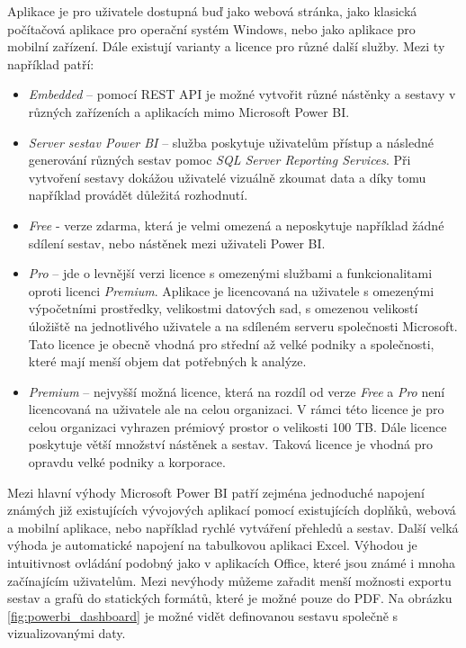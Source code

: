 \documentclass[czech,master]{diploma}
\begin{document}
Aplikace je pro uživatele dostupná buď jako webová stránka, jako klasická počítačová aplikace pro operační systém Windows, nebo jako aplikace pro mobilní zařízení. Dále existují varianty a licence pro různé další služby. Mezi ty například patří: \cite{ref:microsoft_bi_general}
\begin{itemize}
\item \textit{Embedded} -- pomocí REST API je možné vytvořit různé nástěnky a sestavy v různých zařízeních a aplikacích mimo Microsoft Power BI.
\item \textit{Server sestav Power BI} -- služba poskytuje uživatelům přístup a následné generování různých sestav pomoc \textit{SQL Server Reporting Services}. Při vytvoření sestavy dokážou uživatelé vizuálně zkoumat data a díky tomu například provádět důležitá rozhodnutí.
\item \textit{Free} - verze zdarma, která je velmi omezená a neposkytuje například žádné sdílení sestav, nebo nástěnek mezi uživateli Power BI.
\item \textit{Pro} -- jde o levnější verzi licence s omezenými službami a funkcionalitami oproti licenci \textit{Premium}. Aplikace je licencovaná na uživatele s omezenými výpočetními prostředky, velikostmi datových sad, s omezenou velikostí úložiště na jednotlivého uživatele a na sdíleném serveru společnosti Microsoft. Tato licence je obecně vhodná pro střední až velké podniky a společnosti, které mají menší objem dat potřebných k analýze.
\item \textit{Premium} -- nejvyšší možná licence, která na rozdíl od verze \textit{Free} a \textit{Pro} není licencovaná na uživatele ale na celou organizaci. V rámci této licence je pro celou organizaci vyhrazen prémiový prostor o velikosti 100 TB. Dále licence poskytuje větší množství nástěnek a sestav. Taková licence je vhodná pro opravdu velké podniky a korporace.
\end{itemize}

Mezi hlavní výhody Microsoft Power BI patří zejména jednoduché napojení známých již existujících vývojových aplikací pomocí existujících doplňků, webová a mobilní aplikace, nebo například rychlé vytváření přehledů a sestav. \cite{ref:microsoft_bi_general} Další velká výhoda je automatické napojení na tabulkovou aplikaci Excel. Výhodou je intuitivnost ovládání podobný jako v aplikacích Office, které jsou známé i mnoha začínajícím uživatelům. Mezi nevýhody můžeme zařadit menší možnosti exportu sestav a grafů do statických formátů, které je možné pouze do PDF. Na obrázku \ref{fig:powerbi_dashboard} je možné vidět definovanou sestavu společně s vizualizovanými daty.
\end{document}
